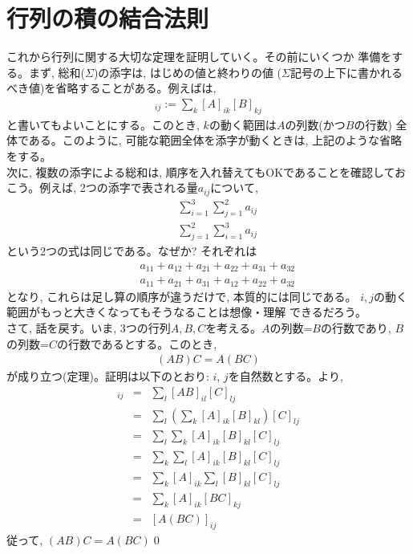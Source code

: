\section{行列の積の結合法則}

これから行列に関する大切な定理を証明していく。その前にいくつか
準備をする。まず, 総和($\Sigma$)の添字は, はじめの値と終わりの値
($\Sigma$記号の上下に書かれるべき値)を省略することがある。例えばは, 
\begin{eqnarray*}
[AB]_{ij}:=\sum_{k}[A]_{ik}[B]_{kj}
\end{eqnarray*}
と書いてもよいことにする。このとき, $k$の動く範囲は$A$の列数(かつ$B$の行数)
全体である。このように, 可能な範囲全体を添字が動くときは, 
上記のような省略をする。\\

次に, 複数の添字による総和は, 順序を入れ替えてもOKであることを確認しておこう。例えば, 
2つの添字で表される量$a_{ij}$について, 
\begin{eqnarray*}
&&\sum_{i=1}^{3}\sum_{j=1}^{2}a_{ij}\\
&&\sum_{j=1}^{2}\sum_{i=1}^{3}a_{ij}
\end{eqnarray*}
という2つの式は同じである。なぜか? それぞれは
\begin{eqnarray*}
&&a_{11}+a_{12}+a_{21}+a_{22}+a_{31}+a_{32}\\
&&a_{11}+a_{21}+a_{31}+a_{12}+a_{22}+a_{32}
\end{eqnarray*}
となり, これらは足し算の順序が違うだけで, 本質的には同じである。
$i, j$の動く範囲がもっと大きくなってもそうなることは想像・理解
できるだろう。\\

さて, 話を戻す。いま, 3つの行列$A, B, C$を考える。$A$の列数=$B$の行数であり, 
$B$の列数=$C$の行数であるとする。このとき, 
\begin{eqnarray}(AB)C=A(BC)\label{eq:matrix_association_law}\end{eqnarray}
が成り立つ(定理)。証明は以下のとおり: $i$, $j$を自然数とする。より, 
\begin{eqnarray*}
[(AB)C]_{ij}&=&\sum_{l}[AB]_{il}[C]_{lj}\\
&=&\sum_{l}(\sum_{k}[A]_{ik}[B]_{kl})[C]_{lj}\\
&=&\sum_{l}\sum_{k}[A]_{ik}[B]_{kl}[C]_{lj}\\
&=&\sum_{k}\sum_{l}[A]_{ik}[B]_{kl}[C]_{lj}\\
&=&\sum_{k}[A]_{ik}\sum_{l}[B]_{kl}[C]_{lj}\\
&=&\sum_{k}[A]_{ik}[BC]_{kj}\\
&=&[A(BC)]_{ij}
\end{eqnarray*}
従って, $(AB)C=A(BC)$\qed
\mv


